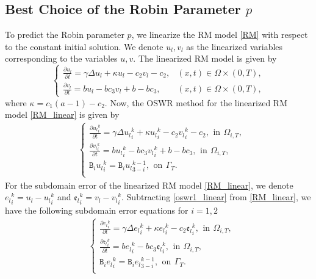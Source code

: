 \documentclass[11pt]{article}
\begin{document}
\subsection{Best Choice of the Robin Parameter $p$}
To predict the Robin parameter $p$, we linearize the RM model \eqref{RM} with respect to the constant initial solution. We denote $u_l, v_l$ as the linearized variables corresponding to the variables $u, v$. The linearized RM model is given by 
\begin{equation}\label{RM_linear}
\begin{cases}
\frac{\partial u_l}{\partial t}  = \gamma \Delta u_l +\kappa u_l -c_2v_l -c_2, & (x,t)\in\Omega\times(0,T),\\
\frac{\partial v_l}{\partial t} = bu_l - bc_3v_l + b-bc_3 , & (x,t)\in\Omega\times(0,T),
\end{cases}
\end{equation}
where $\kappa=c_1(a-1)-c_2$. Now, the OSWR method for the linearized RM model \eqref{RM_linear} is given by 
\begin{equation}\label{oswr1_linear}
\begin{aligned}
&\left\{
\begin{aligned}
\frac{\partial {u_l}_i^{k}}{\partial t}  = \gamma \Delta {u_l}_i^{k} +\kappa{u_l}_i^{k} -c_2{v_l}_i^{k} -c_2, \,\ \text{in} \,\ \Omega_{i,T},\\
\frac{\partial {v_l}_i^{k}}{\partial t}  = b{u_l}_i^{k} - bc_3{v_l}_i^{k} +b-bc_3 ,\,\ \text{in} \,\ \Omega_{i,T},  \\
\mathtt{B}_i {u_l}_i^{k}
 = 
\mathtt{B}_i {u_l}_{3-i}^{k-1},
\,\ \mbox{on}\,\ \Gamma_{T}.\\
\end{aligned}\right.
\end{aligned}
\end{equation}
For the subdomain error of the linearized RM model \eqref{RM_linear}, we denote ${e_l}_i^{k}=u_l-{u_l}_i^{k}$ and ${\mathfrak{e}_l}_i^{k}=v_l-{v_l}_i^{k}$. Subtracting \eqref{oswr1_linear} from \eqref{RM_linear}, we have the following subdomain error equations for $i=1, 2$ 
\begin{equation}\label{oswr1_linear_err}
\begin{aligned}
&\left\{
\begin{aligned}
\frac{\partial {e_l}_i^{k}}{\partial t}  = \gamma \Delta {e_l}_i^{k} +\kappa{e_l}_i^{k} -c_2{\mathfrak{e}_l}_i^{k}, \,\ \text{in} \,\ \Omega_{i,T},\\
\frac{\partial {\mathfrak{e}_l}_i^{k}}{\partial t}  = b{e_l}_i^{k} - bc_3{\mathfrak{e}_l}_i^{k} ,\,\ \text{in} \,\ \Omega_{i,T},  \\
\mathtt{B}_i {e_l}_i^{k}
 = 
\mathtt{B}_i {e_l}_{3-i}^{k-1},
\,\ \mbox{on}\,\ \Gamma_{T}.\\
\end{aligned}\right.
\end{aligned}
\end{equation} 
\end{document}
